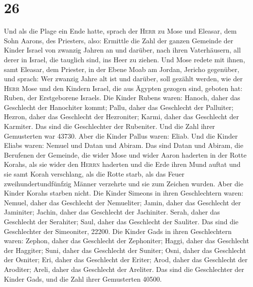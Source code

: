 \hypertarget{section-25}{%
\section{26}\label{section-25}}

 Und als die Plage ein Ende hatte, sprach der
\textsc{Herr} zu Mose und Eleasar, dem Sohn Aarons, des Priesters, also:
 Ermittle die Zahl der ganzen Gemeinde der Kinder Israel
von zwanzig Jahren an und darüber, nach ihren Vaterhäusern, all derer in
Israel, die tauglich sind, ins Heer zu ziehen.  Und Mose
redete mit ihnen, samt Eleasar, dem Priester, in der Ebene Moab am
Jordan, Jericho gegenüber, und sprach:  Wer zwanzig Jahre
alt ist und darüber, soll gezählt werden, wie der \textsc{Herr} Mose und
den Kindern Israel, die aus Ägypten gezogen sind, geboten hat:
 Ruben, der Erstgeborene Israels. Die Kinder Rubens waren:
Hanoch, daher das Geschlecht der Hanochiter kommt; Pallu, daher das
Geschlecht der Palluiter;  Hezron, daher das Geschlecht
der Hezroniter; Karmi, daher das Geschlecht der Karmiter. 
Das sind die Geschlechter der Rubeniter. Und die Zahl ihrer Gemusterten
war 43730.  Aber die Kinder Pallus waren: Eliab.
 Und die Kinder Eliabs waren: Nemuel und Datan und Abiram.
Das sind Datan und Abiram, die Berufenen der Gemeinde, die wider Mose
und wider Aaron haderten in der Rotte Korahs, als sie wider den
\textsc{Herrn} haderten  und die Erde ihren Mund auftat
und sie samt Korah verschlang, als die Rotte starb, als das Feuer
zweihundertundfünfzig Männer verzehrte und sie zum Zeichen wurden.
 Aber die Kinder Korahs starben nicht. 
Die Kinder Simeons in ihren Geschlechtern waren: Nemuel, daher das
Geschlecht der Nemueliter; Jamin, daher das Geschlecht der Jaminiter;
Jachin, daher das Geschlecht der Jachiniter.  Serah,
daher das Geschlecht der Serahiter; Saul, daher das Geschlecht der
Sauliter.  Das sind die Geschlechter der Simeoniter,
22200.  Die Kinder Gads in ihren Geschlechtern waren:
Zephon, daher das Geschlecht der Zephoniter; Haggi, daher das Geschlecht
der Haggiter; Suni, daher das Geschlecht der Suniter; 
Osni, daher das Geschlecht der Osniter; Eri, daher das Geschlecht der
Eriter;  Arod, daher das Geschlecht der Aroditer; Areli,
daher das Geschlecht der Areliter.  Das sind die
Geschlechter der Kinder Gads, und die Zahl ihrer Gemusterten 40500.
